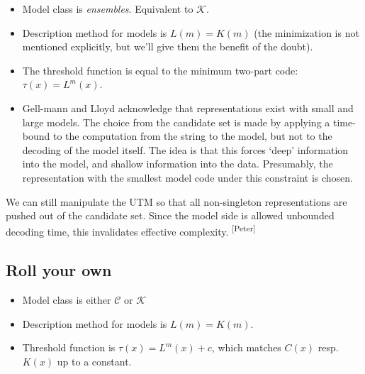 \documentclass{style/llncs}
\newcommand{\C}{\mathcal C}
\newcommand{\K}{\mathcal K}
\newcommand{\pb}[1]{\textcolor{OliveGreen}{\small #1 \textsuperscript{[Peter]} }}
\begin{document}
\begin{itemize}
\item Model class is \emph{ensembles}. Equivalent to $\K$.
\item Description method for models is $L(m) = K(m)$ (the minimization is not mentioned explicitly, but we'll give them the benefit of the doubt).
\item The threshold function is equal to the minimum two-part code: $\tau(x)=L^m(x)$.
\item Gell-mann and Lloyd acknowledge that representations exist with small and large models. The choice from the candidate set is made by applying a time-bound to the computation from the string to the model, but not to the decoding of the model itself. The idea is that this forces `deep' information into the model, and shallow information into the data. Presumably, the representation with the smallest model code under this constraint is chosen.   
\end{itemize} 
\pb{We can still manipulate the UTM so that all non-singleton representations are pushed out of the candidate set. Since the model side is allowed unbounded decoding time, this invalidates effective complexity.}

\subsection{Roll your own}


\begin{itemize}
\item Model class is either $\C$ or $\K$
\item Description method for models is $L(m)=K(m)$.
\item Threshold function is $\tau(x)=L^m(x)+c$, which matches $C(x)$
  resp. $K(x)$ up to a constant.
\end{itemize}
\end{document}
